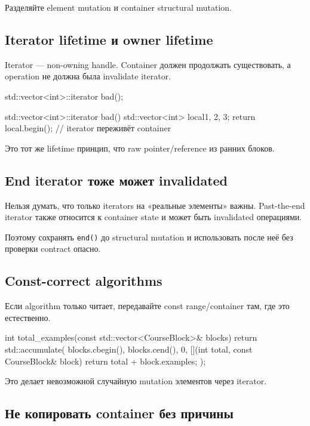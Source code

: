 Разделяйте element mutation и container structural mutation.

\subsection{Iterator lifetime и owner lifetime}

Iterator --- non-owning handle. Container должен продолжать существовать,
а operation не должна была invalidate iterator.

\begin{cppcode}
std::vector<int>::iterator bad();

std::vector<int>::iterator bad() {
    std::vector<int> local{1, 2, 3};
    return local.begin(); // iterator переживёт container
}
\end{cppcode}

Это тот же lifetime принцип, что raw pointer/reference из ранних блоков.

\subsection{End iterator тоже может invalidated}

Нельзя думать, что только iterators на «реальные элементы» важны.
Past-the-end iterator также относится к container state и может быть invalidated
операциями.

Поэтому сохранять \texttt{end()} до structural mutation и использовать после
неё без проверки contract опасно.

\subsection{Const-correct algorithms}

Если algorithm только читает, передавайте const range/container там, где это
естественно.

\begin{cppcode}
int total_examples(const std::vector<CourseBlock>& blocks) {
    return std::accumulate(
        blocks.cbegin(),
        blocks.cend(),
        0,
        [](int total, const CourseBlock& block) {
            return total + block.examples;
        }
    );
}
\end{cppcode}

Это делает невозможной случайную mutation элементов через iterator.

\subsection{Не копировать container без причины}

